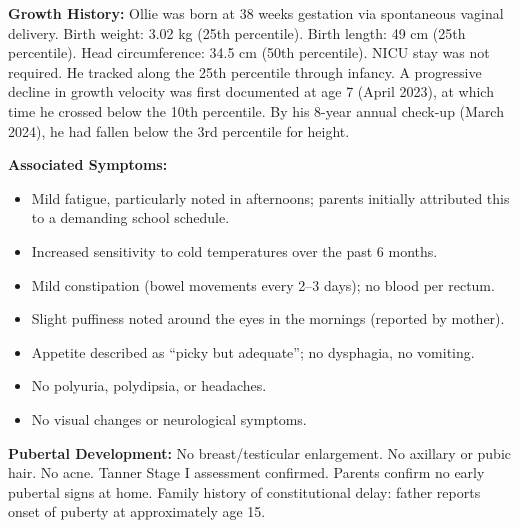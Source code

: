 \documentclass[11pt,a4paper]{article}
\begin{document}
\vspace{3mm}

\begin{tcolorbox}[pednote, title={\faClipboardList\enspace History of Presenting Illness}]

\textbf{\color{PedTeal}Growth History:}
Ollie was born at 38 weeks gestation via spontaneous vaginal delivery.
Birth weight: 3.02 kg (25th percentile). Birth length: 49 cm (25th percentile).
Head circumference: 34.5 cm (50th percentile). NICU stay was not required.
He tracked along the 25th percentile through infancy. A progressive decline in
growth velocity was first documented at age 7 (April 2023), at which time he
crossed below the 10th percentile. By his 8-year annual check-up (March 2024),
he had fallen below the 3rd percentile for height.

\medskip
\textbf{\color{PedTeal}Associated Symptoms:}
\begin{itemize}[leftmargin=1.4em, itemsep=2pt, topsep=2pt]
  \item Mild fatigue, particularly noted in afternoons; parents initially
        attributed this to a demanding school schedule.
  \item Increased sensitivity to cold temperatures over the past 6 months.
  \item Mild constipation (bowel movements every 2--3 days); no blood per rectum.
  \item Slight puffiness noted around the eyes in the mornings (reported by mother).
  \item Appetite described as ``picky but adequate''; no dysphagia, no vomiting.
  \item No polyuria, polydipsia, or headaches.
  \item No visual changes or neurological symptoms.
\end{itemize}

\medskip
\textbf{\color{PedTeal}Pubertal Development:}
No breast/testicular enlargement. No axillary or pubic hair. No acne.
Tanner Stage I assessment confirmed. Parents confirm no early pubertal signs
at home. Family history of constitutional delay: father reports onset of
puberty at approximately age 15.

\end{tcolorbox}

\vspace{3mm}
\end{document}
